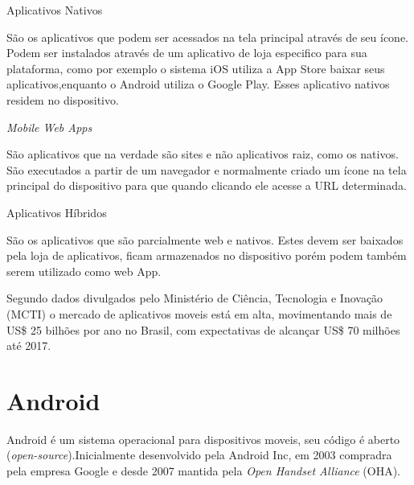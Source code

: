 \begin{alineascomponto}

\item Aplicativos Nativos

São os aplicativos que podem ser acessados na tela principal através de seu ícone. Podem ser instalados através de um aplicativo de loja especifico para sua plataforma, como por exemplo o sistema iOS utiliza a App Store baixar seus aplicativos,enquanto o Android utiliza o Google Play. Esses aplicativo nativos residem no dispositivo.

\item \textit{Mobile Web Apps}

São aplicativos que na verdade são sites e não aplicativos raiz, como os nativos. São executados a partir de um navegador e normalmente criado um ícone na tela principal do dispositivo para que quando clicando ele acesse a URL determinada.

\item Aplicativos Híbridos

São os aplicativos que são parcialmente web e nativos.
Estes devem ser baixados pela loja de aplicativos, ficam armazenados no dispositivo porém podem também serem utilizado como web App.

	\end{alineascomponto} 
	
Segundo dados divulgados pelo Ministério de Ciência, Tecnologia e Inovação (MCTI) o mercado de aplicativos moveis está em alta, movimentando mais de US\$ 25 bilhões por ano no Brasil, com expectativas de alcançar US\$ 70 milhões até 2017. \cite{mcti}
	
	

	

\section{Android}
\label{sec:Android}
Android é um sistema operacional para dispositivos moveis, seu código é aberto (\textit{open-source}).Inicialmente desenvolvido pela Android Inc, em 2003 compradra pela empresa Google e desde 2007 mantida pela \textit{Open Handset Alliance} (OHA).

